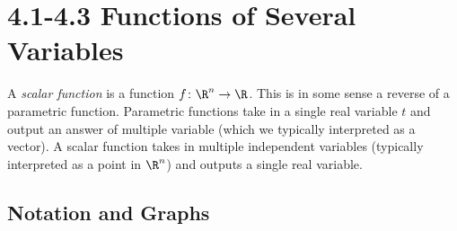 \section*{4.1-4.3 Functions of Several Variables}

A \textit{scalar function} is a function \(f \colon \R^{n} \to \R\). This is in some sense a reverse of a parametric function. Parametric functions take in a single real variable \(t\) and output an answer of multiple variable (which we typically interpreted as a vector). A scalar function takes in multiple independent variables (typically interpreted as a point in \(\R^{n}\)) and outputs a single real variable.

\subsection{Notation and Graphs}


